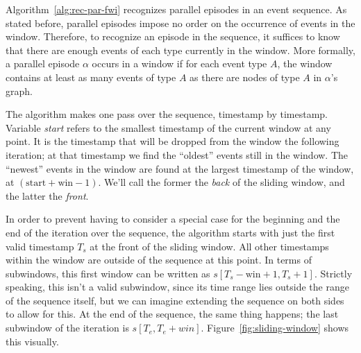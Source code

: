 Algorithm~\ref{alg:rec-par-fwi} recognizes parallel episodes in an event sequence. As stated before, parallel episodes impose no order on the occurrence of events in the window. Therefore, to recognize an episode in the sequence, it suffices to know that there are enough events of each type currently in the window. More formally, a parallel episode $ \alpha $ occurs in a window if for each event type $ A $, the window contains at least as many events of type $ A $ as there are nodes of type $ A $ in $ \alpha $'s graph.

The algorithm makes one pass over the sequence, timestamp by timestamp. Variable \emph{start} refers to the smallest timestamp of the current window at any point. It is the timestamp that will be dropped from the window the following iteration; at that timestamp we find the ``oldest'' events still in the window. The ``newest'' events in the window are found at the largest timestamp of the window, at $ (\text{start} + \text{win} - 1) $. We'll call the former the \emph{back} of the sliding window, and the latter the \emph{front}.

In order to prevent having to consider a special case for the beginning and the end of the iteration over the sequence, the algorithm starts with just the first valid timestamp $ T_s $ at the front of the sliding window. All other timestamps within the window are outside of the sequence at this point. In terms of subwindows, this first window can be written as $ s[T_s - \text{win} + 1, T_s + 1] $. Strictly speaking, this isn't a valid subwindow, since its time range lies outside the range of the sequence itself, but we can imagine extending the sequence on both sides to allow for this. At the end of the sequence, the same thing happens; the last subwindow of the iteration is $ s[T_e, T_e + win] $. Figure~\ref{fig:sliding-window} shows this visually.

